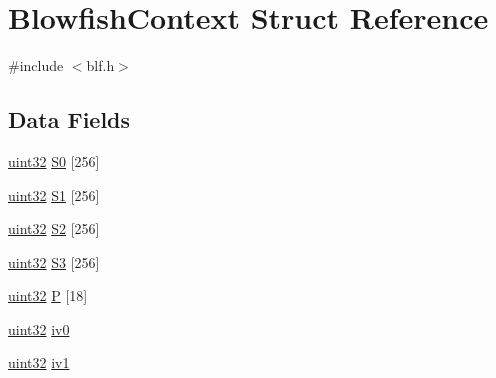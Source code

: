 \hypertarget{structBlowfishContext}{\section{Blowfish\-Context Struct Reference}
\label{structBlowfishContext}
}


{\ttfamily \#include $<$blf.\-h$>$}

\subsection*{Data Fields}
\begin{DoxyCompactItemize}
\item 
\hyperlink{c_8h_a1134b580f8da4de94ca6b1de4d37975e}{uint32} \hyperlink{structBlowfishContext_a736b98792c3562062d6d95f10f200437}{S0} \mbox{[}256\mbox{]}
\item 
\hyperlink{c_8h_a1134b580f8da4de94ca6b1de4d37975e}{uint32} \hyperlink{structBlowfishContext_a2055ed05016aa2deae873afceae591e6}{S1} \mbox{[}256\mbox{]}
\item 
\hyperlink{c_8h_a1134b580f8da4de94ca6b1de4d37975e}{uint32} \hyperlink{structBlowfishContext_ad8104967f5b964f5c0c2f10443c1b2aa}{S2} \mbox{[}256\mbox{]}
\item 
\hyperlink{c_8h_a1134b580f8da4de94ca6b1de4d37975e}{uint32} \hyperlink{structBlowfishContext_a82698e87c73d32dcd253a558f3ebb685}{S3} \mbox{[}256\mbox{]}
\item 
\hyperlink{c_8h_a1134b580f8da4de94ca6b1de4d37975e}{uint32} \hyperlink{structBlowfishContext_a5d05589f7d074010916fb2988e8bd473}{P} \mbox{[}18\mbox{]}
\item 
\hyperlink{c_8h_a1134b580f8da4de94ca6b1de4d37975e}{uint32} \hyperlink{structBlowfishContext_aa80f8ad06bdd18fef0be9554f2ea5510}{iv0}
\item 
\hyperlink{c_8h_a1134b580f8da4de94ca6b1de4d37975e}{uint32} \hyperlink{structBlowfishContext_a518bdae94e7c2c78e1df8360613c6169}{iv1}
\end{DoxyCompactItemize}


